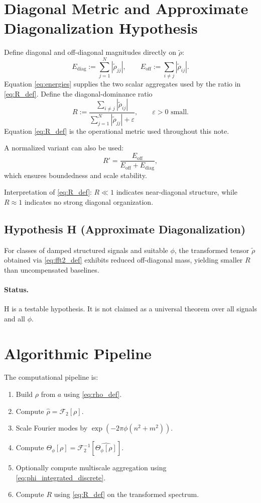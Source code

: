 \documentclass[11pt]{article}
\begin{document}
\section{Diagonal Metric and Approximate Diagonalization Hypothesis}
Define diagonal and off-diagonal magnitudes directly on $\widetilde{\rho}$:
\begin{equation}
E_{\mathrm{diag}} := \sum_{j=1}^{N} |\widetilde{\rho}_{jj}|,
\qquad
E_{\mathrm{off}} := \sum_{i\neq j}|\widetilde{\rho}_{ij}|.
\label{eq:energies}
\end{equation}
Equation \eqref{eq:energies} supplies the two scalar aggregates used by the ratio in \eqref{eq:R_def}.
Define the diagonal-dominance ratio
\begin{equation}
R := \frac{\sum_{i\neq j}|\widetilde{\rho}_{ij}|}{\sum_{j=1}^{N}|\widetilde{\rho}_{jj}|+\varepsilon}, \qquad \varepsilon>0\text{ small}.
\label{eq:R_def}
\end{equation}
Equation \eqref{eq:R_def} is the operational metric used throughout this note.

A normalized variant can also be used:
\[
R' = \frac{E_{\mathrm{off}}}{E_{\mathrm{off}} + E_{\mathrm{diag}}},
\]
which ensures boundedness and scale stability.

Interpretation of \eqref{eq:R_def}: $R\ll 1$ indicates near-diagonal structure, while $R\approx 1$ indicates no strong diagonal organization.

\subsection*{Hypothesis H (Approximate Diagonalization)}
For classes of damped structured signals and suitable $\phi$, the transformed tensor $\widetilde{\rho}$ obtained via \eqref{eq:fft2_def} exhibits reduced off-diagonal mass, yielding smaller $R$ than uncompensated baselines.

\paragraph{Status.}
H is a testable hypothesis. It is not claimed as a universal theorem over all signals and all $\phi$.

\section{Algorithmic Pipeline}
The computational pipeline is:
\begin{enumerate}
    \item Build $\rho$ from $a$ using \eqref{eq:rho_def}.
    \item Compute $\widehat{\rho}=\mathcal{F}_2[\rho]$.
    \item Scale Fourier modes by $\exp\!(-2\pi\phi(n^2+m^2))$.
    \item Compute $\Theta_{\phi}[\rho]=\mathcal{F}_2^{-1}[\widehat{\Theta_{\phi}[\rho]}]$.
    \item Optionally compute multiscale aggregation using \eqref{eq:phi_integrated_discrete}.
    \item Compute $R$ using \eqref{eq:R_def} on the transformed spectrum.
\end{enumerate}
\end{document}
